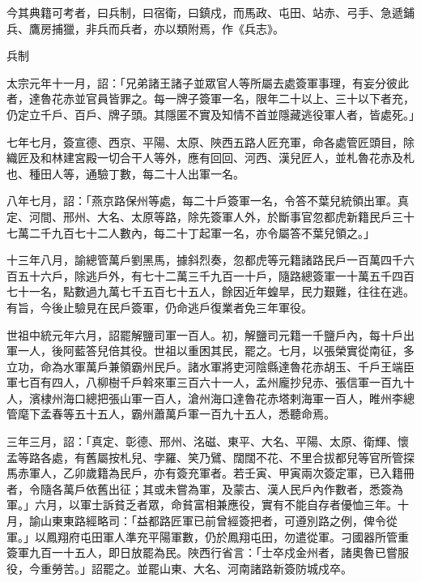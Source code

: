 \begin{pinyinscope}
 今其典籍可考者，曰兵制，曰宿衛，曰鎮戍，而馬政、屯田、站赤、弓手、急遞鋪兵、鷹房捕獵，非兵而兵者，亦以類附焉，作《兵志》。



 兵制



 太宗元年十一月，詔：「兄弟諸王諸子並眾官人等所屬去處簽軍事理，有妄分彼此者，達魯花赤並官員皆罪之。每一牌子簽軍一名，限年二十以上、三十以下者充，仍定立千戶、百戶、牌子頭。其隱匿不實及知情不首並隱藏逃役軍人者，皆處死。」



 七年七月，簽宣德、西京、平陽、太原、陜西五路人匠充軍，命各處管匠頭目，除織匠及和林建宮殿一切合干人等外，應有回回、河西、漢兒匠人，並札魯花赤及札也、種田人等，通驗丁數，每二十人出軍一名。



 八年七月，詔：「燕京路保州等處，每二十戶簽軍一名，令答不葉兒統領出軍。真定、河間、邢州、大名、太原等路，除先簽軍人外，於斷事官忽都虎新籍民戶三十七萬二千九百七十二人數內，每二十丁起軍一名，亦令屬答不葉兒領之。」



 十三年八月，諭總管萬戶劉黑馬，據斜烈奏，忽都虎等元籍諸路民戶一百萬四千六百五十六戶，除逃戶外，有七十二萬三千九百一十戶，隨路總簽軍一十萬五千四百七十一名，點數過九萬七千五百七十五人，餘因近年蝗旱，民力艱難，往往在逃。有旨，今後止驗見在民戶簽軍，仍命逃戶復業者免三年軍役。



 世祖中統元年六月，詔罷解鹽司軍一百人。初，解鹽司元籍一千鹽戶內，每十戶出軍一人，後阿藍答兒倍其役。世祖以重困其民，罷之。七月，以張榮實從南征，多立功，命為水軍萬戶兼領霸州民戶。諸水軍將吏河陰縣達魯花赤胡玉、千戶王端臣軍七百有四人，八柳樹千戶斡來軍三百六十一人，孟州龐抄兒赤、張信軍一百九十人，濱棣州海口總把張山軍一百人，滄州海口達魯花赤塔剌海軍一百人，睢州李總管麾下孟春等五十五人，霸州蕭萬戶軍一百九十五人，悉聽命焉。



 三年三月，詔：「真定、彰德、邢州、洺磁、東平、大名、平陽、太原、衛輝、懷孟等路各處，有舊屬按札兒、孛羅、笑乃鷿、闊闊不花、不里合拔都兒等官所管探馬赤軍人，乙卯歲籍為民戶，亦有簽充軍者。若壬寅、甲寅兩次簽定軍，已入籍冊者，令隨各萬戶依舊出征；其或未嘗為軍，及蒙古、漢人民戶內作數者，悉簽為軍。」六月，以軍士訴貧乏者眾，命貧富相兼應役，實有不能自存者優恤三年。十月，諭山東東路經略司：「益都路匠軍已前曾經簽把者，可遵別路之例，俾令從軍。」以鳳翔府屯田軍人準充平陽軍數，仍於鳳翔屯田，勿遣從軍。刁國器所管重簽軍九百一十五人，即日放罷為民。陜西行省言：「士卒戍金州者，諸奧魯已嘗服役，今重勞苦。」詔罷之。並罷山東、大名、河南諸路新簽防城戍卒。




\end{pinyinscope}
